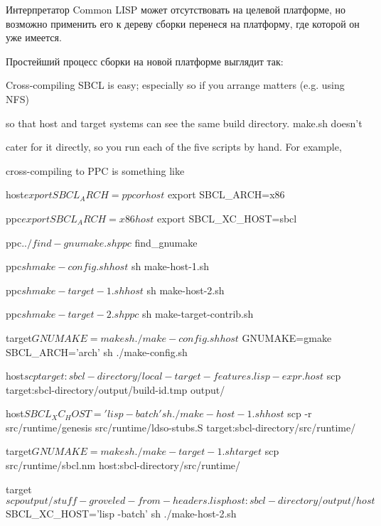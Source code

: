 Интерпретатор Common LISP может отсутствовать на целевой платформе, но
возможно применить его к дереву сборки перенеся на платформу, где
которой он уже имеется.

Простейший процесс сборки на новой платформе выглядит так:

Cross-compiling SBCL is easy; especially so if you arrange matters (e.g. using NFS)

so that host and target systems can see the same build directory. make.sh doesn't

cater for it directly, so you run each of the five scripts by hand. For example,

cross-compiling to PPC is something like


host$ export SBCL_ARCH=ppc

or


host$ export SBCL_ARCH=x86

ppc$ export SBCL_ARCH=x86


host$ export SBCL_XC_HOST=sbcl

ppc$ . ./find-gnumake.sh

ppc$ find_gnumake

ppc$ sh make-config.sh

host$ sh make-host-1.sh

ppc$ sh make-target-1.sh

host$ sh make-host-2.sh

ppc$ sh make-target-2.sh

ppc$ sh make-target-contrib.sh



target$ GNUMAKE=make sh ./make-config.sh

host$ GNUMAKE=gmake SBCL_ARCH='arch' sh ./make-config.sh

host$ scp target:sbcl-directory/local-target-features.lisp-expr .

host$ scp target:sbcl-directory/output/build-id.tmp output/

host$ SBCL_XC_HOST='lisp -batch' sh ./make-host-1.sh

host$ scp -r src/runtime/genesis src/runtime/ldso-stubs.S target:sbcl-directory/src/runtime/

target$ GNUMAKE=make sh ./make-target-1.sh

target$ scp src/runtime/sbcl.nm host:sbcl-directory/src/runtime/

target$ scp output/stuff-groveled-from-headers.lisp host:sbcl-directory/output/

host$ SBCL_XC_HOST='lisp -batch' sh ./make-host-2.sh

